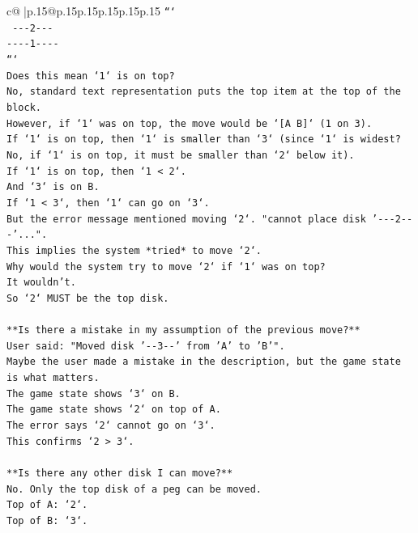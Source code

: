 \documentclass{article}
\begin{document}
{\begin{supertabular}{c@{$\;$}|p{.15\linewidth}@{}p{.15\linewidth}p{.15\linewidth}p{.15\linewidth}p{.15\linewidth}p{.15\linewidth}}
{{{\texttt{```} \\
\texttt{ {-}{-}{-}2{-}{-}{-}} \\
\texttt{{-}{-}{-}{-}1{-}{-}{-}{-}} \\
\texttt{```} \\
\texttt{Does this mean `1` is on top?} \\
\texttt{No, standard text representation puts the top item at the top of the block.} \\
\texttt{However, if `1` was on top, the move would be `{[}A B{]}` (1 on 3).} \\
\texttt{If `1` is on top, then `1` is smaller than `3` (since `1` is widest? No, if `1` is on top, it must be smaller than `2` below it).} \\
\texttt{If `1` is on top, then `1 < 2`.} \\
\texttt{And `3` is on B.} \\
\texttt{If `1 < 3`, then `1` can go on `3`.} \\
\texttt{But the error message mentioned moving `2`. "cannot place disk '{-}{-}{-}2{-}{-}{-}'...".} \\
\texttt{This implies the system *tried* to move `2`.} \\
\texttt{Why would the system try to move `2` if `1` was on top?} \\
\texttt{It wouldn't.} \\
\texttt{So `2` MUST be the top disk.} \\
\\ 
\texttt{**Is there a mistake in my assumption of the previous move?**} \\
\texttt{User said: "Moved disk '{-}{-}3{-}{-}' from 'A' to 'B'".} \\
\texttt{Maybe the user made a mistake in the description, but the game state is what matters.} \\
\texttt{The game state shows `3` on B.} \\
\texttt{The game state shows `2` on top of A.} \\
\texttt{The error says `2` cannot go on `3`.} \\
\texttt{This confirms `2 > 3`.} \\
\\ 
\texttt{**Is there any other disk I can move?**} \\
\texttt{No. Only the top disk of a peg can be moved.} \\
\texttt{Top of A: `2`.} \\
\texttt{Top of B: `3`.} \\
}}}
\end{supertabular}}
\end{document}
